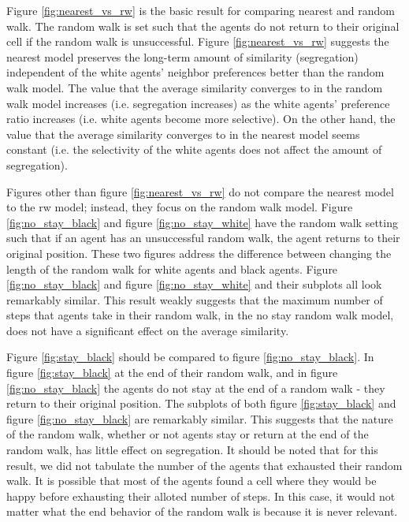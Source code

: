 \documentclass[11pt,twoside]{amsart}
\theoremstyle{theorem}
\theoremstyle{definition}
\theoremstyle{remark}
\begin{document}
Figure \ref{fig:nearest_vs_rw} is the basic result for comparing nearest and random walk.
The random walk is set such that the agents do not return to their original cell if the random walk is unsuccessful. 
Figure \ref{fig:nearest_vs_rw} suggests the nearest model preserves the long-term amount of similarity (segregation) independent of the white agents' neighbor preferences better than the random walk model. 
The value that the average similarity converges to in the random walk model increases (i.e. segregation increases) as the white agents' preference ratio increases (i.e. white agents become more selective).
On the other hand, the value that the average similarity converges to in the nearest model seems constant (i.e. the selectivity of the white agents does not affect the amount of segregation).

Figures other than figure \ref{fig:nearest_vs_rw} do not compare the nearest model to the rw model; instead, they focus on the random walk model.
Figure \ref{fig:no_stay_black} and figure \ref{fig:no_stay_white} have the random walk setting such that if an agent has an unsuccessful random walk, the agent returns to their original position. 
These two figures address the difference between changing the length of the random walk for white agents and black agents. 
Figure \ref{fig:no_stay_black} and figure \ref{fig:no_stay_white} and their subplots all look remarkably similar.
This result weakly suggests that the maximum number of steps that agents take in their random walk, in the no stay random walk model, does not have a significant effect on the average similarity.

Figure \ref{fig:stay_black} should be compared to figure \ref{fig:no_stay_black}. In figure \ref{fig:stay_black} at the end of their random walk, and in figure \ref{fig:no_stay_black} the agents do not stay at the end of a random walk - they return to their original position.
The subplots of both figure \ref{fig:stay_black} and figure \ref{fig:no_stay_black} are remarkably similar. 
This suggests that the nature of the random walk, whether or not agents stay or return at the end of the random walk, has little effect on segregation. 
It should be noted that for this result, we did not tabulate the number of the agents that exhausted their random walk. 
It is possible that most of the agents found a cell where they would be happy before exhausting their alloted number of steps. 
In this case, it would not matter what the end behavior of the random walk is because it is never relevant. 
\end{document}

